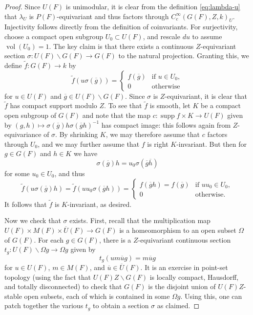 \documentclass[reqno]{amsart}
\numberwithin{equation}{subsection}
\newcommand{\wt}[1]{\widetilde{#1}}
\newcommand{\ol}[1]{\overline{#1}}
\newcommand{\co}{\colon}
\DeclareMathOperator{\supp}{supp}
\theoremstyle{remark}
\numberwithin{equation}{subsection}
\numberwithin{figure}{subsection}
\begin{document}
\begin{proof}
Since $U(F)$ is unimodular, it is clear from the definition \eqref{eq:lambda-u} that $\lambda_U$ is $P(F)$-equivariant and thus factors through $C_c^\infty(G(F),Z,k)_U$. Injectivity follows directly from the definition of coinvariants. For surjectivity, choose a compact open subgroup $U_0 \subset U(F)$, and rescale $du$ to assume $\operatorname{vol}(U_0) = 1$. The key claim is that there exists a continuous $Z$-equivariant section $\sigma\co U(F)\backslash G(F) \to G(F)$ to the natural projection. Granting this, we define $\wt f\co G(F) \to k$ by
\[
\wt f(u\sigma(\ol g)) = \begin{cases}
    f(\ol g) &\text{if } u \in U_0, \\
    0 &\text{otherwise}
\end{cases}
\]
for $u \in U(F)$ and $\ol g \in U(F)\backslash G(F)$. Since $\sigma$ is $Z$-equivariant, it is clear that $\wt f$ has compact support modulo $Z$. To see that $\wt f$ is smooth, let $K$ be a compact open subgroup of $G(F)$ and note that the map $c\co \supp f \times K \to U(F)$ given by $(g, h) \mapsto \sigma(\ol g)h\sigma(\ol g h)^{-1}$ has compact image: this follows again from $Z$-equivariance of $\sigma$. By shrinking $K$, we may therefore assume that $c$ factors through $U_0$, and we may further assume that $f$ is right $K$-invariant. But then for $g \in G(F)$ and $h \in K$ we have
\[
\sigma(\ol g)h = u_0\sigma(\ol g\ol h)
\]
for some $u_0 \in U_0$, and thus
\[
\wt f(u\sigma(\ol g)h) = \wt f(uu_0\sigma(\ol g h)) = \begin{cases}
    f(\ol g h) = f(\ol g) &\text{if } uu_0 \in U_0, \\
    0 &\text{otherwise.}
\end{cases}
\]
It follows that $\wt f$ is $K$-invariant, as desired.

Now we check that $\sigma$ exists. First, recall that the multiplication map $U(F) \times M(F) \times \ol U(F) \to G(F)$ is a homeomorphism to an open subset $\Omega$ of $G(F)$. For each $g \in G(F)$, there is a $Z$-equivariant continuous section $t_g\co U(F)\backslash \Omega g \to \Omega g$ given by
\[
t_g(um\ol u g) = m\ol u g
\]
for $u \in U(F)$, $m \in M(F)$, and $\ol u \in \ol U(F)$. It is an exercise in point-set topology (using the fact that $U(F)Z\backslash G(F)$ is locally compact, Hausdorff, and totally disconnected) to check that $G(F)$ is the disjoint union of $U(F)Z$-stable open subsets, each of which is contained in some $\Omega g$. Using this, one can patch together the various $t_g$ to obtain a section $\sigma$ as claimed.
\end{proof}
\end{document}
